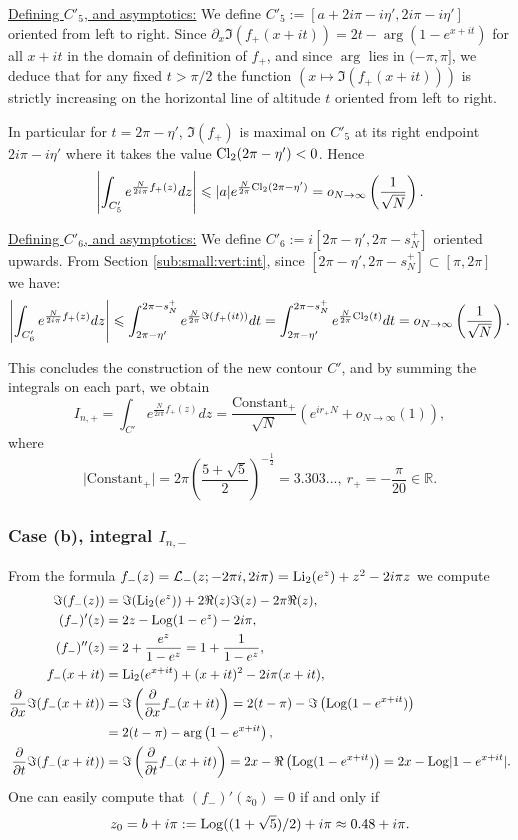 \documentclass[11pt]{amsart}
\newcommand{\R}{\mathbb{R}}
\newcommand{\Log}{{\rm Log}}
\begin{document}
{\underline{Defining $C'_5$, and asymptotics:} We define $C'_5:=[a+2i\pi-i\eta',2i\pi-i\eta']$ oriented from left to right.
Since $\partial_x \Im (f_+(x+it)) = 2t - \arg\left (1-e^{x+it}\right )$ for all $x+it$ in the domain of definition of $f_+$, and since $\arg$ lies in $(-\pi,\pi]$, we deduce that for any fixed $t>\pi/2$ the function $\left (x\mapsto \Im (f_+(x+it))\right )$ is strictly increasing on the horizontal line of altitude $t$ oriented from left to right.

In particular for $t=2\pi - \eta'$, $\Im (f_+)$ is maximal on $C'_5$ at its right endpoint $2i\pi-i\eta'$ where it takes the value ${\rm Cl}_2(2\pi-\eta')<0$.
Hence 
$$ \left |\int_{C'_5} e^{\frac{N}{2 i \pi}f_+(z)}dz\right | \leqslant
|a|e^{\frac{N}{2 \pi}{\rm Cl}_2(2\pi-\eta')} = o_{N\to \infty}\left (\frac{1}{\sqrt{N}}\right ).$$


\underline{Defining $C'_6$, and asymptotics:} We define $C'_6:=i[2\pi-\eta',2\pi-s_N^+]$ oriented upwards. From Section \ref{sub:small:vert:int}, since $[2\pi-\eta',2\pi-s_N^+] \subset [\pi,2\pi]$ we have:
$$ \left |\int_{C'_6} e^{\frac{N}{2 i \pi}f_+(z)}dz\right | \leqslant
\int_{2\pi-\eta'}^{2\pi-s_N^+} e^{\frac{N}{2 \pi}\Im(f_+(it))}dt=
\int_{2\pi-\eta'}^{2\pi-s_N^+} e^{\frac{N}{2 \pi}{\rm Cl}_2(t)}dt = o_{N\to \infty}\left (\frac{1}{\sqrt{N}}\right ).$$


This concludes the construction of the new contour $C'$, and by summing the integrals on each part, we obtain
$$ I_{n,+}=\int_{C'} e^{\frac{N}{2 i \pi}f_+(z)}dz = \dfrac{\text{Constant}_+}{\sqrt{N}}(e^{i r_+ N}+o_{N\to\infty}(1)),$$
where
\begin{equation}\label{Cst+}
\vert \mathrm{Constant}_+ \vert  = 2\pi \left (\frac{5+\sqrt{5}}{2}\right )^{-\frac{1}{2}}=3.303...,\ r_+=-\frac{\pi}{20}\in \R.
\end{equation} 

\subsubsection{Case (b), integral $I_{n,-}$}\label{sec:bIn-janv26} From the formula $f_-(z)=\mathcal{L}_-(z;-2\pi i,2i\pi) = {\rm Li}_2(e^{z})+z^2 -2i\pi z$ we compute
\begin{align*}\Im(f_-(z))&= \Im({\rm Li}_2(e^{z}))+2 \Re(z)\Im(z)-2\pi\Re(z),\\
(f_-)'(z)&=2z- \Log(1-e^z)-2i\pi,\\
(f_-)''(z)& =2 + \dfrac{e^z}{1-e^z} = 1 + \dfrac{1}{1-e^z},\\
f_-(x+it)&= {\rm Li}_2(e^{x+it})+(x+it)^2 -2i\pi(x+it),\\
\dfrac{\partial}{\partial x} \Im (f_-(x+it)) & = \Im \left (\dfrac{\partial}{\partial x}f_-(x+it)\right ) = 2(t-\pi) - \Im \left (\Log(1-e^{x+it})\right )
\\ &= 2(t-\pi) - \arg\left (1-e^{x+it}\right ),\\
\dfrac{\partial}{\partial t} \Im (f_-(x+it)) & = \Im \left (\dfrac{\partial}{\partial t}f_-(x+it)\right ) = 2x- \Re \left (\Log(1-e^{x+it})\right )
= 2x - \Log \vert 1-e^{x+it} \vert.
\end{align*}
One can easily compute that $(f_-)'(z_0)=0$ if and only if $$z_0 = b+i\pi:= \Log((1+\sqrt{5})/2)+i\pi \approx 0.48+i\pi.$$

}
\end{document}
